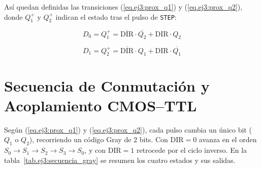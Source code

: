 Así quedan definidas las transiciones (\ref{eq.ej3:prox_q1}) y (\ref{eq.ej3:prox_q2}), donde $Q_1^+$ y $Q_2^+$
indican el estado tras el pulso de \texttt{STEP}:

\begin{equation}
  D_0 = Q_1^+ = \overline{\text{DIR}} \cdot \overline{Q_2} + \text{DIR} \cdot Q_2
  \label{eq.ej3:prox_q1}
\end{equation}

\begin{equation}
  D_1 = Q_2^+ = \overline{\text{DIR}} \cdot Q_1 + \text{DIR} \cdot \overline{Q_1}
  \label{eq.ej3:prox_q2}
\end{equation}

\section{Secuencia de Conmutación y Acoplamiento CMOS--TTL}
\label{sec:secuencia_acoplamiento}

Según (\ref{eq.ej3:prox_q1}) y (\ref{eq.ej3:prox_q2}), cada pulso cambia un único bit ($Q_1$ o $Q_2$),
recorriendo un código Gray de 2 bits. Con $\text{DIR} = 0$ avanza en el orden $S_0 \to S_1 \to S_2 \to S_3 \to S_0$,
y con $\text{DIR} = 1$ retrocede por el ciclo inverso. En la tabla~\ref{tab.ej3:secuencia_gray} se resumen los
cuatro estados y sus salidas.

\begin{table}[!ht]
  \centering
  \caption{Tabla de estados del secuenciador digital y polaridad de las fases para ambos sentidos de giro.}
  \label{tab.ej3:secuencia_gray}
\end{table}


